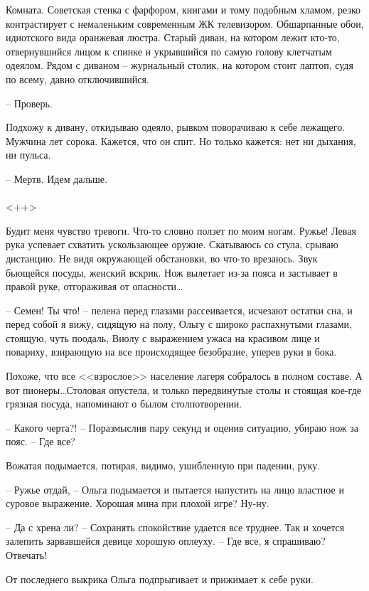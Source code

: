 \documentclass[a4paper]{book}
\begin{document}
Комната. Советская стенка с фарфором, книгами и тому подобным хламом, резко контрастирует с немаленьким современным ЖК телевизором. Обшарпанные обои, идиотского вида оранжевая люстра. Старый диван, на котором лежит кто-то, отвернувшийся лицом к спинке и укрывшийся по самую голову клетчатым одеялом. Рядом с диваном -- журнальный столик, на котором стоит лаптоп, судя по всему, давно отключившийся.

-- Проверь. 

Подхожу к дивану, откидываю одеяло, рывком поворачиваю к себе лежащего. Мужчина лет сорока. Кажется, что он спит. Но только кажется: нет ни дыхания, ни пульса.

-- Мертв. Идем дальше.


\paragraph{}<++>

Будит меня чувство тревоги. Что-то словно ползет по моим ногам. Ружье! Левая рука успевает схватить ускользающее оружие. Скатываюсь со стула, срываю  дистанцию. Не видя окружающей обстановки, во что-то врезаюсь. Звук бьющейся посуды, женский вскрик. Нож вылетает из-за пояса и застывает в правой руке, отгораживая от опасности\ldots

-- Семен! Ты что! -- пелена перед глазами рассеивается, исчезают остатки сна, и перед собой я вижу, сидящую на полу, Ольгу с широко распахнутыми глазами, стоящую, чуть поодаль, Виолу с выражением ужаса на красивом лице и повариху, взирающую на все происходящее безобразие, уперев руки в бока.

Похоже, что все <<взрослое>> население лагеря собралось в полном составе. А вот пионеры\ldots Столовая опустела, и только передвинутые столы и стоящая кое-где грязная посуда, напоминают о былом столпотворении. 

-- Какого черта?! -- Поразмыслив пару секунд и оценив ситуацию, убираю нож за пояс. -- Где все?

Вожатая подымается, потирая, видимо, ушибленную при падении, руку. 

-- Ружье отдай, -- Ольга подымается и пытается напустить на лицо властное и суровое выражение. Хорошая мина при плохой игре? Ну-ну. 

-- Да с хрена ли? -- Сохранять спокойствие удается все труднее. Так и хочется залепить зарвавшейся девице хорошую оплеуху. -- Где все, я спрашиваю? Отвечать!

От последнего выкрика Ольга подпрыгивает и прижимает к себе руки. 
\end{document}
